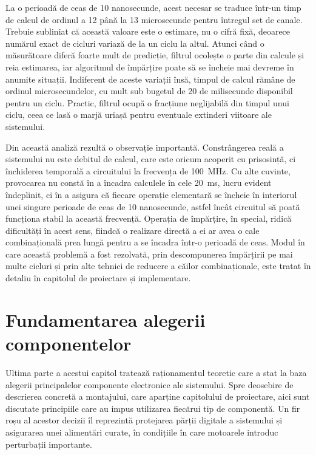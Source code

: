 La o perioadă de ceas de 10 nanosecunde, acest necesar se traduce într-un timp de
calcul de ordinul a 12 până la 13 microsecunde pentru întregul set de canale.
Trebuie subliniat că această valoare este o estimare, nu o cifră fixă, deoarece
numărul exact de cicluri variază de la un ciclu la altul. Atunci când o măsurătoare
diferă foarte mult de predicție, filtrul ocolește o parte din calcule și reia
estimarea, iar algoritmul de împărțire poate să se încheie mai devreme în anumite
situații. Indiferent de aceste variații însă, timpul de calcul rămâne de ordinul
microsecundelor, cu mult sub bugetul de 20 de milisecunde disponibil pentru un
ciclu. Practic, filtrul ocupă o fracțiune neglijabilă din timpul unui ciclu, ceea
ce lasă o marjă uriașă pentru eventuale extinderi viitoare ale sistemului.

Din această analiză rezultă o observație importantă. Constrângerea reală a
sistemului nu este debitul de calcul, care este oricum acoperit cu prisosință, ci
închiderea temporală a circuitului la frecvența de 100~MHz. Cu alte cuvinte,
provocarea nu constă în a încadra calculele în cele 20~ms, lucru evident
îndeplinit, ci în a asigura că fiecare operație elementară se încheie în interiorul
unei singure perioade de ceas de 10 nanosecunde, astfel încât circuitul să poată
funcționa stabil la această frecvență. Operația de împărțire, în special, ridică
dificultăți în acest sens, fiindcă o realizare directă a ei ar avea o cale
combinațională prea lungă pentru a se încadra într-o perioadă de ceas. Modul în
care această problemă a fost rezolvată, prin descompunerea împărțirii pe mai multe
cicluri și prin alte tehnici de reducere a căilor combinaționale, este tratat în
detaliu în capitolul de proiectare și implementare.

\section{Fundamentarea alegerii componentelor}
\label{sec:analiza-componente}

Ultima parte a acestui capitol tratează raționamentul teoretic care a stat la baza
alegerii principalelor componente electronice ale sistemului. Spre deosebire de
descrierea concretă a montajului, care aparține capitolului de proiectare, aici sunt
discutate principiile care au impus utilizarea fiecărui tip de componentă. Un fir
roșu al acestor decizii îl reprezintă protejarea părții digitale a sistemului și
asigurarea unei alimentări curate, în condițiile în care motoarele introduc
perturbații importante.

